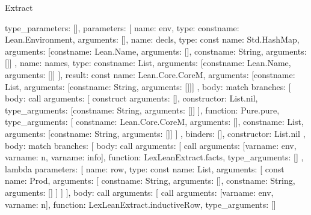\begin{lexlean}{Extract}
\begin{toolingmodule}
{{      type_parameters: [],
      parameters: [
        {name: env, type: const{name: Lean.Environment, arguments: []}},
        {
          name: decls,
          type: const{
            name: Std.HashMap,
            arguments: [const{name: Lean.Name, arguments: []}, const{name: String, arguments: []}]
          }
        },
        {name: names, type: const{name: List, arguments: [const{name: Lean.Name, arguments: []}]}}
      ],
      result: const{
        name: Lean.Core.CoreM,
        arguments: [const{name: List, arguments: [const{name: String, arguments: []}]}]
      },
      body: match{
        branches: [
          {
            body: call{
              arguments: [
                construct{
                  arguments: [],
                  constructor: List.nil,
                  type_arguments: [const{name: String, arguments: []}]
                }
              ],
              function: Pure.pure,
              type_arguments: [
                const{name: Lean.Core.CoreM, arguments: []},
                const{name: List, arguments: [const{name: String, arguments: []}]}
              ]
            },
            binders: [],
            constructor: List.nil
          },
          {
            body: match{
              branches: [
                {
                  body: call{
                    arguments: [
                      call{
                        arguments: [var{name: env}, var{name: n}, var{name: info}],
                        function: LexLeanExtract.facts,
                        type_arguments: []
                      },
                      lambda{
                        parameters: [
                          {
                            name: row,
                            type: const{
                              name: List,
                              arguments: [
                                const{
                                  name: Prod,
                                  arguments: [
                                    const{name: String, arguments: []},
                                    const{name: String, arguments: []}
                                  ]
                                }
                              ]
                            }
                          }
                        ],
                        body: call{
                          arguments: [
                            call{
                              arguments: [var{name: env}, var{name: n}],
                              function: LexLeanExtract.inductiveRow,
                              type_arguments: []
}}}}}}}}}}
\end{toolingmodule}
\end{lexlean}
